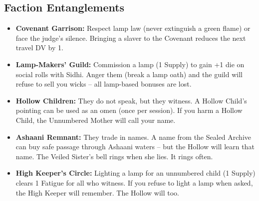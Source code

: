 \subsection*{Faction Entanglements}
\begin{itemize}
  \item \textbf{Covenant Garrison:} Respect lamp law (never extinguish a green flame) or face the judge's silence. Bringing a slaver to the Covenant reduces the next travel DV by 1.
  \item \textbf{Lamp-Makers' Guild:} Commission a lamp (1 Supply) to gain +1 die on social rolls with Sidhi. Anger them (break a lamp oath) and the guild will refuse to sell you wicks -- all lamp-based bonuses are lost.
  \item \textbf{Hollow Children:} They do not speak, but they witness. A Hollow Child's pointing can be used as an omen (once per session). If you harm a Hollow Child, the Unnumbered Mother will call your name.
  \item \textbf{Ashaani Remnant:} They trade in names. A name from the Sealed Archive can buy safe passage through Ashaani waters -- but the Hollow will learn that name. The Veiled Sister's bell rings when she lies. It rings often.
  \item \textbf{High Keeper's Circle:} Lighting a lamp for an unnumbered child (1 Supply) clears 1 Fatigue for all who witness. If you refuse to light a lamp when asked, the High Keeper will remember. The Hollow will too.
\end{itemize}

